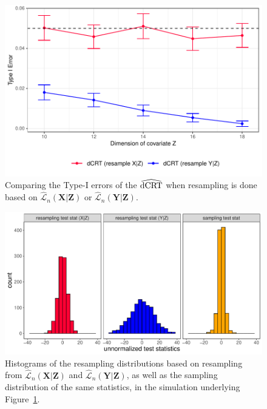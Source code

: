 \documentclass[aos]{imsart}
\theoremstyle{definition}
\theoremstyle{remark}
\newcommand{\prx}{\bm X}								%
\newcommand{\prz}{\bm Z}								%
\newcommand{\pry}{{\bm Y}}								%
\newcommand{\lawhat}{\widehat{\mathcal L}}				%
\newcommand{\dCRThat}{\widehat{\textnormal{dCRT}}}		%
\begin{document}
	\begin{figure}[ht]
		\centering
		\includegraphics[width=\linewidth]{Figures/asymmetry_Poisson_type_I_error.pdf}
		\caption{Comparing the Type-I errors of the $\dCRThat$ when resampling is done based on $\lawhat_n(\prx|\prz)$ or $\lawhat_n(\pry|\prz)$.}
		\label{fig:dCRT_GCM_double_poisson_type_I_err} 
	\end{figure}

	\begin{figure}[ht]
		\centering
			\includegraphics[width=\linewidth]{Figures/histogram_asymmetry_investigation.pdf}
		\caption{Histograms of the resampling distributions based on resampling from $\lawhat_n(\prx|\prz)$ and $\lawhat_n(\pry|\prz)$, as well as the sampling distribution of the same statistics, in the simulation underlying Figure~\ref{fig:dCRT_GCM_double_poisson_type_I_err}.}
		\label{fig:dCRT_GCM_double_poisson_histogram} 
	\end{figure}
\end{document}
